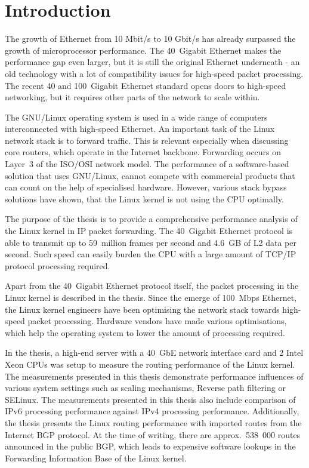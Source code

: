 
\chapter{Introduction}
The growth of Ethernet from 10 Mbit/s to 10 Gbit/s has already surpassed
the growth of microprocessor performance.
The 40~Gigabit Ethernet makes the performance gap even larger, but
it is still the original Ethernet underneath - an old technology
with a lot of compatibility issues for high-speed packet processing.
The recent 40 and 100~Gigabit Ethernet standard opens doors to
high-speed networking, but it requires other parts of the network to scale within.

The GNU/Linux operating system is used in a wide range of computers interconnected with high-speed Ethernet.
An important task of the Linux network stack is to forward traffic.
This is relevant especially when discussing core routers, which operate in the Internet backbone.
Forwarding occurs on Layer~3 of the ISO/OSI network model.
The performance of a software-based solution that uses GNU/Linux, cannot compete
with commercial products that can count on the help of specialised hardware.
However, various stack bypass solutions have shown, that the Linux kernel is not using
the CPU optimally.

The purpose of the thesis is to provide a comprehensive performance analysis of the Linux kernel
in IP packet forwarding.
The 40~Gigabit Ethernet protocol is able to transmit up to 59~million frames per second
and 4.6~GB of L2 data per second.
Such speed can easily burden the CPU with a large amount of TCP/IP protocol processing required.

Apart from the 40~Gigabit Ethernet protocol itself,
the packet processing in the Linux kernel is described in the thesis.
Since the emerge of 100~Mbps Ethernet, the Linux kernel
engineers have been optimising the network stack towards high-speed packet processing.
Hardware vendors have made various optimisations,
which help the operating system to lower the amount of processing required.

In the thesis, a high-end server with a 40~GbE network interface card
and 2 Intel Xeon CPUs was setup to measure the routing performance of the Linux kernel.
The measurements presented in this thesis demonstrate performance influences of various system settings
such as scaling mechanisms, Reverse path filtering or SELinux.
The measurements presented in this thesis also include comparison of IPv6 processing performance
against IPv4 processing performance.
Additionally, the thesis presents the Linux routing performance with imported routes from the Internet BGP protocol.
At the time of writing, there are approx.~538~000 routes announced in the public BGP,
which leads to expensive software lookups in the Forwarding Information Base of the Linux kernel.

